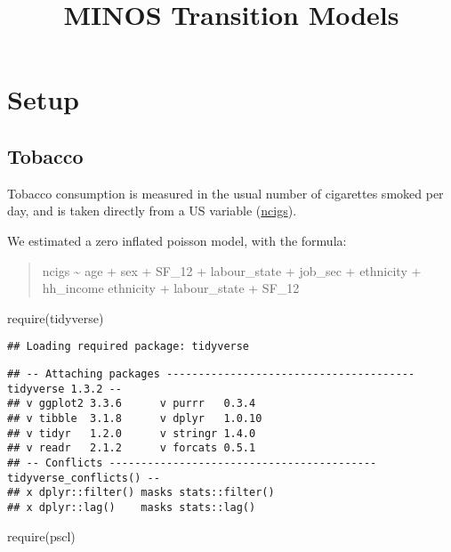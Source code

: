 \documentclass[
]{article}
\title{MINOS Transition Models}
\author{}
\date{\vspace{-2.5em}}
\newenvironment{Shaded}{\begin{snugshade}}{\end{snugshade}}
\newcommand{\FunctionTok}[1]{\textcolor[rgb]{0.00,0.00,0.00}{#1}}
\newcommand{\NormalTok}[1]{#1}
\begin{document}
\maketitle

\hypertarget{setup}{%
\section{Setup}\label{setup}}

\hypertarget{tobacco}{%
\subsection{Tobacco}\label{tobacco}}

Tobacco consumption is measured in the usual number of cigarettes smoked
per day, and is taken directly from a US variable
(\href{https://www.understandingsociety.ac.uk/documentation/mainstage/dataset-documentation/variable/ncigs}{ncigs}).

We estimated a zero inflated poisson model, with the formula:

\begin{quote}
ncigs \textasciitilde{} age + sex + SF\_12 + labour\_state + job\_sec +
ethnicity + hh\_income \textbar{} ethnicity + labour\_state + SF\_12
\end{quote}

\begin{Shaded}
\begin{Highlighting}[]
\FunctionTok{require}\NormalTok{(tidyverse)}
\end{Highlighting}
\end{Shaded}

\begin{verbatim}
## Loading required package: tidyverse
\end{verbatim}

\begin{verbatim}
## -- Attaching packages --------------------------------------- tidyverse 1.3.2 --
## v ggplot2 3.3.6      v purrr   0.3.4 
## v tibble  3.1.8      v dplyr   1.0.10
## v tidyr   1.2.0      v stringr 1.4.0 
## v readr   2.1.2      v forcats 0.5.1 
## -- Conflicts ------------------------------------------ tidyverse_conflicts() --
## x dplyr::filter() masks stats::filter()
## x dplyr::lag()    masks stats::lag()
\end{verbatim}

\begin{Shaded}
\begin{Highlighting}[]
\FunctionTok{require}\NormalTok{(pscl)}
\end{Highlighting}
\end{Shaded}
\end{document}

